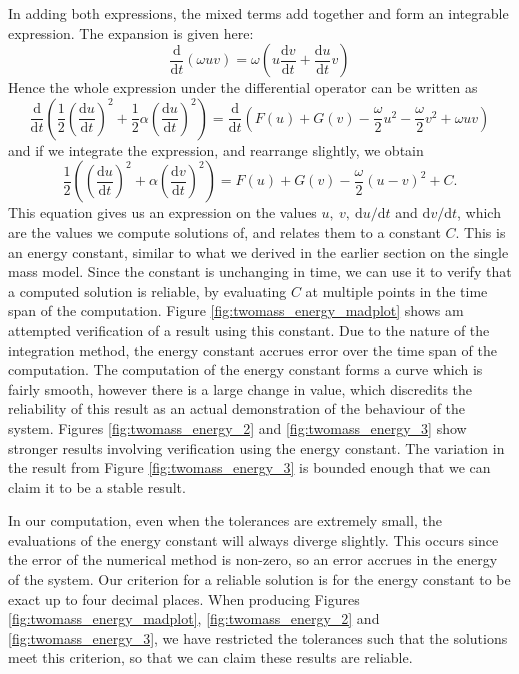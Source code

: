 \documentclass{report}
\begin{document}
In adding both expressions, the mixed terms add together and form an integrable expression.
The expansion is given here:
\begin{equation*}
    \frac{\mathrm{d}}{\mathrm{d}t}(\omega uv) = \omega \left( u \frac{\mathrm{d}v}{\mathrm{d}t} + \frac{\mathrm{d}u}{\mathrm{d}t} v \right)
\end{equation*}
Hence the whole expression under the differential operator can be written as
\begin{equation*}
    \frac{\mathrm{d}}{\mathrm{d}t}\left(
        \frac{1}{2}\left(\frac{\mathrm{d}u}{\mathrm{d}t}\right)^2 + \frac{1}{2}\alpha\left(\frac{\mathrm{d}u}{\mathrm{d}t}\right)^2
    \right) = \frac{\mathrm{d}}{\mathrm{d}t}\left(
        F(u) + G(v) - \frac{\omega}{2}u^2 -\frac{\omega}{2}v^2 + \omega uv
    \right) 
\end{equation*}
and if we integrate the expression, and rearrange slightly, we obtain
\begin{equation}
    \frac{1}{2}\left(
        \left(\frac{\mathrm{d}u}{\mathrm{d}t}\right)^2 + \alpha \left(\frac{\mathrm{d}v}{\mathrm{d}t}\right)^2
    \right) = F(u) + G(v) - \frac{\omega}{2}(u-v)^2 + C.
    \label{eqn:twomass_energy_constant}
\end{equation}
This equation gives us an expression on the values \(u,~v,~\mathrm{d}u/\mathrm{d}t\) and \(\mathrm{d}v/\mathrm{d}t\),
which are the values we compute solutions of, and relates them to a constant $C$.
This is an energy constant, similar to what we derived in the earlier section on the single mass model.
Since the constant is unchanging in time, we can use it to verify that a computed solution is reliable,
by evaluating $C$ at multiple points in the time span of the computation.
Figure \ref{fig:twomass_energy_madplot} shows am attempted verification of a result using this constant.
Due to the nature of the integration method,
the energy constant accrues error over the time span of the computation.
The computation of the energy constant forms a curve which is fairly smooth,
however there is a large change in value,
which discredits the reliability of this result as an actual demonstration of the behaviour of the system.
Figures \ref{fig:twomass_energy_2} and \ref{fig:twomass_energy_3} show stronger results involving verification using the energy constant.
The variation in the result from Figure \ref{fig:twomass_energy_3} is bounded enough that we can claim it to be a stable result.

In our computation, even when the tolerances are extremely small,
the evaluations of the energy constant will always diverge slightly.
This occurs since the error of the numerical method is non-zero,
so an error accrues in the energy of the system.
Our criterion for a reliable solution is for the energy constant to be exact up to four decimal places.
When producing Figures \ref{fig:twomass_energy_madplot}, \ref{fig:twomass_energy_2} and \ref{fig:twomass_energy_3}, we have restricted the tolerances such that the solutions meet this criterion,
so that we can claim these results are reliable.
\end{document}
